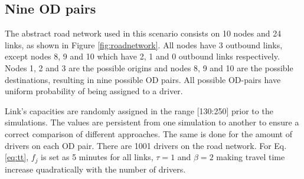 \documentclass{RITA}
\newcommand{\fftt}{\ensuremath{f_j}} 		%
\begin{document}
\subsection{Nine OD pairs}
\label{sec:nineODDescription}
The abstract road network used in this scenario consists on 10 nodes and 24 links, as shown in Figure \ref{fig:roadnetwork}. All nodes have 3 outbound links, except nodes 8, 9 and 10 which have 2, 1 and 0 outbound links respectively. Nodes 1, 2 and 3 are the possible origins and nodes 8, 9 and 10 are the possible destinations, resulting in nine possible OD pairs. All possible OD-pairs have uniform probability of being assigned to a driver. %


Link's capacities are randomly assigned in the range [130:250] prior to the simulations. The values are persistent from one simulation to another to ensure a correct comparison of different approaches. The same is done for the amount of drivers on each OD pair. There are 1001 drivers on the road network. For Eq. \eqref{eq:tt}, $\fftt$ is set as 5 minutes for all links, $\tau = 1$ and $\beta = 2$ making travel time increase quadratically with the number of drivers.
\end{document}
